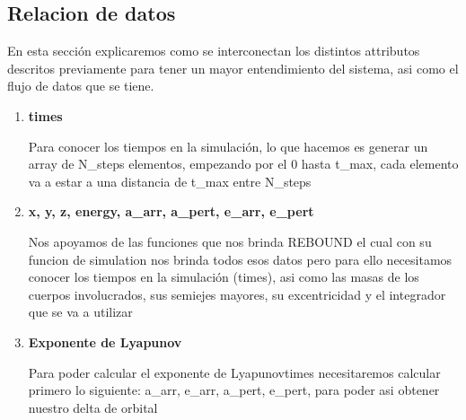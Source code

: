 \subsection{Relacion de datos}

En esta sección explicaremos como se interconectan los distintos attributos descritos previamente para tener un mayor entendimiento del sistema, asi como el flujo de datos que se tiene.

\begin{enumerate}
    
    \item \textbf{times}

    Para conocer los tiempos en la simulación, lo que hacemos es generar un array de N\_steps elementos, empezando por el 0 hasta t\_max, cada elemento va a estar a una distancia de t\_max entre N\_steps

    \item \textbf{x, y, z, energy, a\_arr, a\_pert, e\_arr, e\_pert}

    Nos apoyamos de las funciones que nos brinda REBOUND el cual con su funcion de simulation nos brinda todos esos datos pero para ello necesitamos conocer los tiempos en la simulación (times), asi como las masas de los cuerpos involucrados, sus semiejes mayores, su excentricidad y el integrador que se va a utilizar

    \item \textbf{Exponente de Lyapunov}

    Para poder calcular el exponente de Lyapunovtimes necesitaremos calcular primero lo siguiente: a\_arr, e\_arr, a\_pert, e\_pert, para poder asi obtener nuestro delta de orbital

\end{enumerate}
